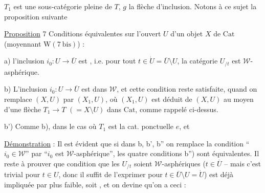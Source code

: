 
$T_1$ est une sous-catégorie pleine de $T$, $g$ la flèche
d'inclusion. Notons à ce sujet la proposition
suivante

\uline{Proposition} 7 Conditions équivalentes sur l'ouvert
$U$ d'un objet $X$ de $\mathrm{Cat}$ (moyennant $\mathrm W(7\ \mathrm{bis})$) :

a) l'inclusion $i_0:U\to\overline U$ est ,
 i.e. pour tout $t\in\dot U=\overline U\setminus U$, la catégorie
$U_{/t}$ est $\mathcal W$-asphérique.

b) L'inclusion $i_0:U\to\overline U$ est dans $\mathcal W$, et cette
condition reste satisfaite, quand on remplace
$(X,U)$ par $(X_1,U)$, où $(X_1,U)$ est déduit de
$(X,U)$ au moyen d'une flèche $T_1\to T$ $(=X\setminus U)$
dans $\mathrm{Cat}$, comme rappelé ci-dessus.


b') Comme b), dans le cas où $T_1$ est la cat. ponctuelle $e$, et


\uline{Démonstration} : Il est évident que si dans b, b', b''
on remplace la condition ``$i_0\in\mathcal W$'' par  ``$i_0$ est
$\mathcal W$-asphérique'', les quatre conditions  b'') sont équivalentes. Il reste à prouver que
 condition que les $U_{/t}$ soient $\mathcal W$-asphériques
($t\in\overline U$ -- mais c'est trivial pour $t\in U$, donc il
suffit de l'exprimer pour $t\in\overline U\setminus U=\dot U$)
est déjà impliquée par  plus faible, soit  ,
et on devine qu'on a ceci :


